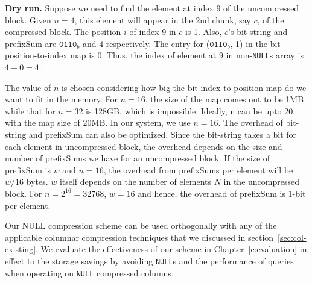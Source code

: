 \textbf{Dry run.} Suppose we need to find the element at index 9 of the uncompressed block. Given $n=4$, this element will appear in the 2nd chunk, say $c$, of the compressed block. The position $i$ of index 9 in $c$ is 1. Also, $c$'s bit-string and prefixSum are $\texttt{0110}_b$ and 4 respectively. The entry for ($\texttt{0110}_b$, 1) in the bit-position-to-index map is 0. Thus, the index of element at 9 in non-\texttt{NULL}s array is $4+0 = 4$.

The value of $n$ is chosen considering how big the bit index to position map do we want to fit in the memory. For $n = 16$, the size of the map comes out to be 1MB while that for $n=32$ is 128GB, which is impossible. Ideally, n can be upto 20, with the map size of 20MB. In our system, we use $n=16$. The overhead of bit-string and prefixSum can also be optimized. Since the bit-string takes a bit for each element in uncompressed block, the overhead depends on the size and number of prefixSums we have for an uncompressed block. If the size of prefixSum is $w$ and $n=16$, the overhead from prefixSums per element will be $w/16$ bytes. $w$ itself depends on the number of elements $N$ in the uncompressed block. For $n=2^16=32768$, $w=16$ and hence, the overhead of prefixSum is 1-bit per element.

Our NULL compression scheme can be used orthogonally with any of the applicable columnar compression techniques that we discussed in section~\ref{sec:col-existing}. We evaluate the effectiveness of our scheme in Chapter~\ref{c:evaluation} in effect to the storage savings by avoiding \texttt{NULL}s and the performance of queries when operating on \texttt{NULL} compressed columns.
















